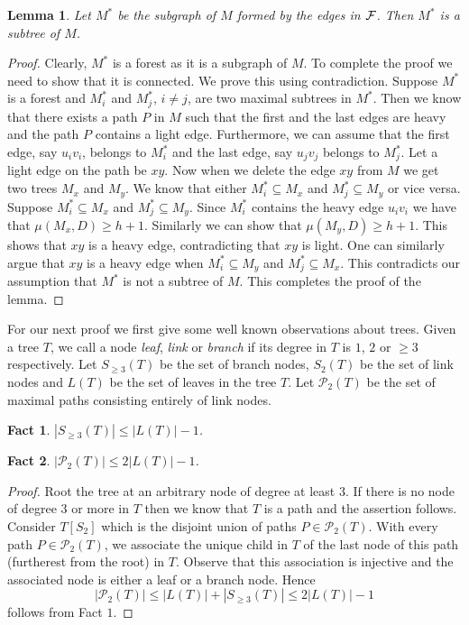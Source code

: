 \documentclass[11pt]{article}
\newtheorem{lemma}{Lemma}
\newtheorem{fact}{Fact}
\begin{document}
\begin{lemma}
Let $M^*$ be the subgraph of $M$ formed by the edges in $\cal F$. Then $M^*$ is a subtree of $M$.
\end{lemma}
\begin{proof}
Clearly, $M^*$ is a forest as it is a subgraph of $M$.  To complete the proof we need to show that it is connected. We prove 
this using contradiction.  Suppose $M^*$ is a forest and  $M_i^*$ and $M_j^*$, $i\neq j$, are two maximal subtrees in $M^*$. Then we know that there exists a path $P$ in $M$ 
such that the first and the last edges are heavy and the path $P$ contains a light edge. 
Furthermore, we can assume that the first edge, say
$u_iv_i$, belongs to $M_i^*$ and the last edge, say  $u_jv_j$ belongs to $M_j^*$. Let a light edge on the path be $xy$. Now when we delete the 
edge $xy$ from $M$ we get two trees $M_x$ and $M_y$. We know that either $M_i^*\subseteq M_x$ and $M_j^*\subseteq M_y$ or vice versa. 
Suppose $M_i^*\subseteq M_x$ and $M_j^*\subseteq M_y$. Since $M_i^*$ contains the heavy edge $u_iv_i$ we have that 
$\mu(M_x,D)\geq h+1$. Similarly we can show that $\mu(M_y,D)\geq h+1$. This shows that $xy$ is a heavy edge, contradicting that $xy$ is light. One can similarly argue that $xy$ is a heavy edge  when  $M_i^*\subseteq M_y$ and $M_j^*\subseteq M_x$. This contradicts our assumption that $M^*$ is not a subtree of $M$. This completes the proof of the lemma.
\end{proof}



For our next proof we first give some well known observations about trees. Given a tree $T$, 
we call a node {\em leaf}, {\em link} or {\em branch} if its degree 
in $T$ is $1$, $2$ or $\geq 3$ respectively. Let
$S_{\geq 3 }(T)$ be the set of branch nodes, $S_{2 }(T)$
be the set of link nodes and $L(T)$ be the set of leaves in the
tree $T$. Let $\mathscr{P}_2(T)$ be the set of maximal paths
consisting entirely of link nodes.

\begin{fact}
\label{fact:simplecounta}
 $|S_{\geq 3 }(T)| \leq |L(T)|-1$.
\end{fact}


\begin{fact}
\label{fact:simplecountb}
 $|\mathscr{P}_2(T)| \leq 2 |L(T)|-1$.
\end{fact}
\begin{proof}
Root the tree at an arbitrary node of degree at least $3$. If there is no node of degree $3$ or more in $T$ 
then we know that $T$ is a path  and the assertion follows. Consider $T[S_2]$ which is the disjoint union of paths
$P\in \mathscr{P}_2(T)$. With every path $P\in \mathscr{P}_2(T)$, we
associate the unique child in $T$ of the last node of this path (furtherest from the root)  in
$T$. Observe that this association is injective and the associated
node is either a leaf or a branch node. Hence 
$$|\mathscr{P}_2(T)| \leq |L(T)|+ |S_{\geq 3 }(T)|\leq  2 |L(T)|-1$$
follows from Fact $1$.
\end{proof}
\end{document}
